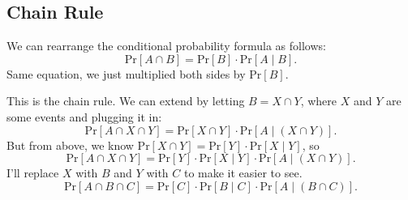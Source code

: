 \documentclass[11pt]{scrartcl}
\begin{document}
\begin{comment}
\begin{example}[2012 AMC 10B \#18]
Suppose that in a certain population, there is a $\frac{1}{500}$ chance any given person has a disease, independent of other people. A blood test is available for screening for this disease. For a person who has this disease, the test always turns out positive. For a person who does not have the disease, however, there is a false positive rate of $\frac{1}{50}$--in other words, for such people, $\frac{49}{50}$ of the time the test will turn out negative, but $\frac{1}{50}$ of the time the test will turn out positive and will incorrectly indicate that the person has the disease. Find the probability that a person who is chosen at random from this population and gets a positive test result actually has the disease.
\end{example}
A bit of a word salad, but we want the probability that the person has the disease, given that they had a positive test result.

So we let $\Omega$ be the probability space associated with picking a person from this population and checking their test result and whether they have the disease or not.

So naturally, we define $A$ to be the event a random person has the disease, and $B$ be the event a random person gives back a positive test result. So we want $\text{Pr}[A \mid B]$. We can use the condition probability formula: \[\text{Pr}[A \mid B] = \frac{\text{Pr}[A \cap B]}{\text{Pr}[B]}.\]

The event described by $A \cap B$ is when a random person has the disease and gives back a positive test result. But we know anyone with the disease automatically tests positive, so for $A \cap B$ to be fulfilled, it is enough for the person to have the disease, which as given, happens with probability $\frac{1}{500}$. So $\text{Pr}[A \cap B] = \frac{1}{500}$. Now, the hard part.
\end{comment}

\subsection{Chain Rule}

We can rearrange the conditional probability formula as follows: \[\text{Pr}[A \cap B] = \text{Pr}[B] \cdot \text{Pr}[A \mid B].\] Same equation, we just multiplied both sides by $\text{Pr}[B]$.

This is the chain rule. We can extend by letting $B = X \cap Y$, where $X$ and $Y$ are some events and plugging it in: \[\text{Pr}[A \cap X \cap Y] = \text{Pr}[X \cap Y] \cdot \text{Pr}[A \mid (X \cap Y)].\] But from above, we know $\text{Pr}[X \cap Y] = \text{Pr}[Y] \cdot \text{Pr}[X \mid Y]$, so \[\text{Pr}[A \cap X \cap Y] = \text{Pr}[Y] \cdot \text{Pr}[X \mid Y] \cdot \text{Pr}[A \mid (X \cap Y)].\] I'll replace $X$ with $B$ and $Y$ with $C$ to make it easier to see. \[\text{Pr}[A \cap B \cap C] = \text{Pr}[C] \cdot \text{Pr}[B \mid C] \cdot \text{Pr}[A \mid (B \cap C)].\]
\end{document}

